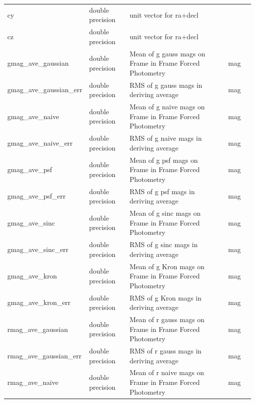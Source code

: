\documentclass[12pt]{article}
\begin{document}
\begin{table}[thbp]
\begin{center}
{\begin{tabular}{llllll}
cy & double precision & unit vector for ra+decl                            &                            &             &   \\
cz & double precision & unit vector for ra+decl                            &                            &             &   \\
gmag\_ave\_gaussian & double precision & Mean of g gauss mags on Frame in Frame Forced Photometry  &                        & mag            &   \\
gmag\_ave\_gaussian\_err & double precision & RMS of g gauss mags in deriving average               &                        & mag            &   \\
gmag\_ave\_naive & double precision & Mean of g naive mags on Frame in Frame Forced Photometry  &                        & mag            &   \\
gmag\_ave\_naive\_err & double precision & RMS of g naive mags in deriving average               &                        & mag            &   \\
gmag\_ave\_psf & double precision & Mean of g psf mags on Frame in Frame Forced Photometry      &                        & mag            &   \\
gmag\_ave\_psf\_err & double precision & RMS of g psf mags in deriving average               &                        & mag            &   \\
gmag\_ave\_sinc & double precision & Mean of g sinc mags on Frame in Frame Forced Photometry      &                        & mag            &   \\
gmag\_ave\_sinc\_err & double precision & RMS of g sinc mags in deriving average               &                        & mag            &   \\
gmag\_ave\_kron & double precision & Mean of g Kron mags on Frame in Frame Forced Photometry      &                        & mag            &   \\
gmag\_ave\_kron\_err & double precision & RMS of g Kron mags in deriving average               &                        & mag            &   \\
rmag\_ave\_gaussian & double precision & Mean of r gauss mags on Frame in Frame Forced Photometry  &                        & mag            &   \\
rmag\_ave\_gaussian\_err & double precision & RMS of r gauss mags in deriving average               &                        & mag            &   \\
rmag\_ave\_naive & double precision & Mean of r naive mags on Frame in Frame Forced Photometry  &                        & mag            &   \\

\end{tabular}}
\end{center}
\end{table}
\end{document}
